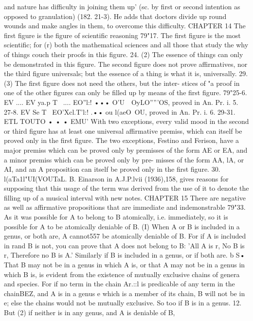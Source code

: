 {{{{{{{{{{{{{{and nature has difficulty in joining them up' (sc. by first or second
intention as opposed to granulation) (182. 21-3). He adds that
doctors divide up round wounds and make angles in them, to
overcome this difficulty.
CHAPTER 14
The first figure is the figure of scientific reasoning
79"17. The first figure is the most scientific; for (r) both the
mathematical sciences and all those that study the why of things
couch their proofs in this figure.
24. (2) The essence of things can only be demonstrated in this
figure. The second figure does not prove affirmatives, nor the
third figure universals; but the essence of a thing is what it is,
universally.
29. (3) The first figure does not need the others, but the inter-
stices of "a proof in one of the other figures can only be filled up
by means of the first figure.
79"25-6. EV .... EV ya.p
T~ .... EO''l:! ••• O'U~~OyLO'''''OS,
proved in An.
Pr. i. 5.
27-8. EV Se T~ EO'Xcl.T'l:! .•• ou l(aeO~OU, proved in An. Pr. i. 6.
29-31. ETL TOUTO • • • EMU' With two exceptions, every valid
mood in the second or third figure has at least one universal
affirmative premiss, which can itself be proved only in the first
figure. The two exceptions, Festino and Ferison, have a major
premiss which can be proved only by premisses of the form AE
or EA, and a minor premiss which can be proved only by pre-
misses of the form AA, lA, or AI, and an A proposition can itself
be proved only in the first figure.
30. l(aTa1l"UI(VOUTaL. B. Einarson in A.J.P.lvii (1936),158, gives
reasons for supposing that this usage of the term was derived
from the use of it to denote the filling up of a musical interval
with new notes.
CHAPTER 15
There are negative as well as affirmative propositions that are
immediate and indemonstrable
79"33. As it was possible for A to belong to B atomically, i.e.
immediately, so it is possible for A to be atomically deniable of
B. (I) When A or B is included in a genus, or both are, A cannot557
be atomically deniable of B. For if A is included in rand B is
not, you can prove that A does not belong to B: 'All A is r, No
B is r, Therefore no B is A.' Similarly if B is included in a genus,
or if both are.
b S• That B may not be in a genus in which A is, or that A
may not be in a genus in which B is, is evident from the existence
of mutually exclusive chains of genera and species. For if no
term in the chain Ar.::l is predicable of any term in the chainBEZ,
and A is in a genus e which is a member of its chain, B will
not be in e; else the chains would not be mutually exclusive.
So too if B is in a genus.
12. But (2) if neither is in any genus, and A is deniable of B,
}}}}}}}}}}}}}}
